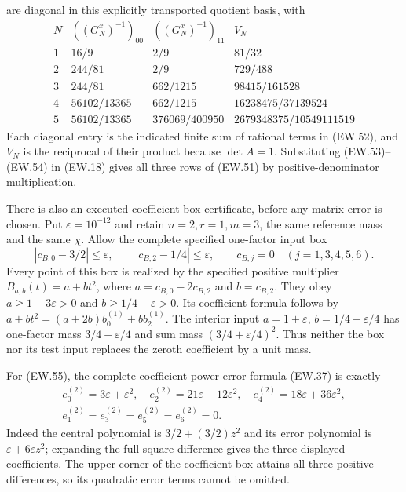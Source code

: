 are diagonal in this explicitly transported quotient basis, with
\[
\begin{array}{c|c|c|c}
 N&((G_N^x)^{-1})_{00}&((G_N^x)^{-1})_{11}&V_N\\\hline
 1&16/9&2/9&81/32\\
 2&244/81&2/9&729/488\\
 3&244/81&662/1215&98415/161528\\
 4&56102/13365&662/1215&16238475/37139524\\
 5&56102/13365&376069/400950&2679348375/10549111519
\end{array}                                                   \tag{EW.54}
\]
Each diagonal entry is the indicated finite sum of rational terms
in (EW.52), and $V_N$ is the reciprocal of their product because
$\det A=1$. Substituting (EW.53)--(EW.54) in (EW.18) gives all
three rows of (EW.51) by positive-denominator multiplication.

There is also an executed coefficient-box certificate, before any
matrix error is chosen. Put $\varepsilon=10^{-12}$ and retain
$n=2,r=1,m=3$, the same reference mass and the same $\chi$.
Allow the complete specified one-factor input box
\[
 |c_{B,0}-3/2|\le\varepsilon,\qquad
 |c_{B,2}-1/4|\le\varepsilon,\qquad
 c_{B,j}=0\quad(j=1,3,4,5,6).                               \tag{EW.55}
\]
Every point of this box is realized by the specified positive multiplier
$B_{a,b}(t)=a+bt^2$, where $a=c_{B,0}-2c_{B,2}$ and
$b=c_{B,2}$. They obey $a\ge1-3\varepsilon>0$ and
$b\ge1/4-\varepsilon>0$. Its coefficient formula follows by
$a+bt^2=(a+2b)b_0^{(1)}+b b_2^{(1)}$.
The interior input $a=1+\varepsilon$, $b=1/4-\varepsilon/4$
has one-factor mass $3/4+\varepsilon/4$ and sum mass
$(3/4+\varepsilon/4)^2$. Thus neither the box nor its test input
replaces the zeroth coefficient by a unit mass.

For (EW.55), the complete coefficient-power error formula (EW.37)
is exactly
\[
 \begin{gathered}
 e_0^{(2)}=3\varepsilon+\varepsilon^2,\quad
 e_2^{(2)}=21\varepsilon+12\varepsilon^2,\quad
 e_4^{(2)}=18\varepsilon+36\varepsilon^2,\\
 e_1^{(2)}=e_3^{(2)}=e_5^{(2)}=e_6^{(2)}=0.
 \end{gathered}                                               \tag{EW.56}
\]
Indeed the central polynomial is $3/2+(3/2)z^2$ and its error
polynomial is $\varepsilon+6\varepsilon z^2$; expanding the
full square difference gives the three displayed coefficients.
The upper corner of the coefficient box attains all three positive
differences, so its quadratic error terms cannot be omitted.

